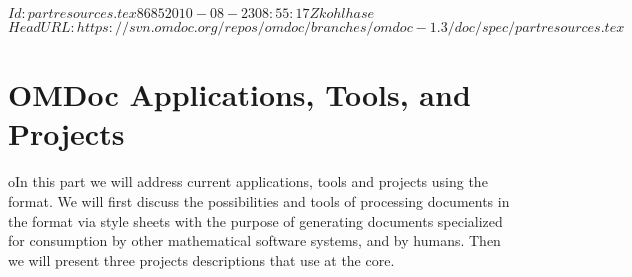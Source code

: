 \svnInfo $Id: partresources.tex 8685 2010-08-23 08:55:17Z kohlhase $
\svnKeyword $HeadURL: https://svn.omdoc.org/repos/omdoc/branches/omdoc-1.3/doc/spec/partresources.tex $

\part{OMDoc Applications, Tools, and Projects}\label{part:applications}
oIn this part we will address current applications, tools and projects using the
{\omdoc} format.  We will first discuss the possibilities and tools of processing
documents in the {\omdoc} format via style sheets with the purpose of generating
documents specialized for consumption by other mathematical software systems, and
by humans. Then we will present three projects descriptions that use {\omdoc} at
the core.

